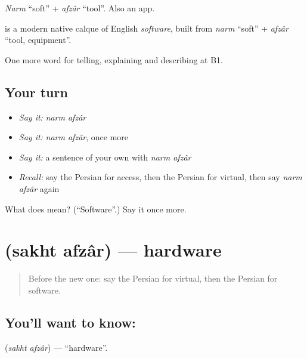 \emph{Narm} \textquotedblleft{}soft\textquotedblright{} + \emph{afzâr} \textquotedblleft{}tool\textquotedblright{}. Also an app.

\begin{cousinweb}
\textbf{ } is a modern native calque of English \emph{software}, built from \emph{narm} \textquotedblleft{}soft\textquotedblright{} + \emph{afzâr} \textquotedblleft{}tool, equipment\textquotedblright{}.
\end{cousinweb}

\begin{grammarlens}[title={What you've built}]
One more word for telling, explaining and describing at B1.
\end{grammarlens}

\subsection*{Your turn}
\begin{itemize}
\raggedright
  \item \emph{Say it:} \emph{narm afzâr}
  \item \emph{Say it:} \emph{narm afzâr}, once more
  \item \emph{Say it:} a sentence of your own with \emph{narm afzâr}
  \item \emph{Recall:} say the Persian for access, then the Persian for virtual, then say \emph{narm afzâr} again
\end{itemize}

\begin{tcolorbox}[breakable,colback=teal!4,colframe=teal!35!black,title={Before you move on}]
What does   mean? (\textquotedblleft{}Software\textquotedblright{}.) Say it once more.
\end{tcolorbox}
\section[\texorpdfstring{\fa{سخت} \fa{افزار} (sakht afzâr)}{سخت افزار (sakht afzâr)}]{  (sakht afzâr) — hardware}

\label{lesson:FA-C418-sakht-afzar}



\begin{quote}
Before the new one: say the Persian for virtual, then the Persian for software.
\end{quote}

\subsection*{You'll want to know:  }
\textbf{ } (\emph{sakht afzâr}) — \textquotedblleft{}hardware\textquotedblright{}.

